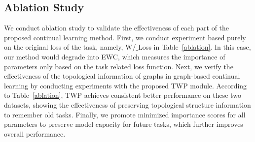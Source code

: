 \documentclass[letterpaper]{article} %
\begin{document}
\subsection{Ablation Study}
We conduct ablation study to validate the effectiveness of
each part of the proposed continual learning method.
First, we conduct experiment based purely on the original loss
of the task, 
namely, W/$\_$Loss in Table~\ref{ablation}.
In this case, our method would degrade into EWC, which measures the importance of parameters only based on the task related loss function.
Next, we verify the effectiveness of the topological information 
of graphs in graph-based continual learning 
by conducting experiments with the proposed TWP module.
According to Table~\ref{ablation}, TWP achieves consistent better 
performance on these two datasets, showing the effectiveness of preserving topological structure information to remember old tasks.
Finally, we promote minimized importance scores for all parameters to preserve model capacity for future tasks, 
which further improves overall performance. 
\end{document}
